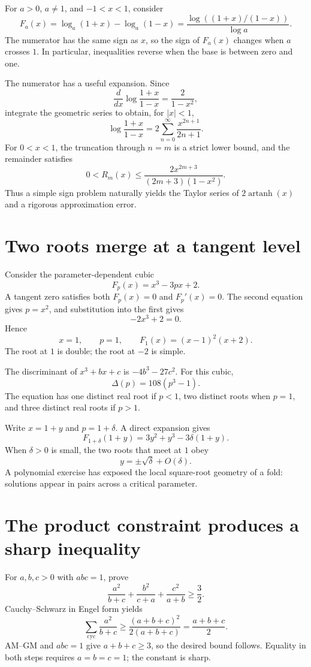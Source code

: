 For \(a>0\), \(a\ne1\), and \(-1<x<1\), consider
\[
 F_a(x)=\log_a(1+x)-\log_a(1-x)
 =\frac{\log((1+x)/(1-x))}{\log a}.
\]
The numerator has the same sign as \(x\), so the sign of \(F_a(x)\) changes when \(a\) crosses \(1\). In particular, inequalities reverse when the base is between zero and one.

The numerator has a useful expansion. Since
\[
 \frac d{dx}\log\frac{1+x}{1-x}=\frac2{1-x^2},
\]
integrate the geometric series to obtain, for \(|x|<1\),
\[
 \boxed{\log\frac{1+x}{1-x}
 =2\sum_{n=0}^{\infty}\frac{x^{2n+1}}{2n+1}.}
\]
For \(0<x<1\), the truncation through \(n=m\) is a strict lower bound, and the remainder satisfies
\[
 0<R_m(x)\le
 \frac{2x^{2m+3}}{(2m+3)(1-x^2)}.
\]
Thus a simple sign problem naturally yields the Taylor series of \(2\operatorname{artanh}(x)\) and a rigorous approximation error.

\section{Two roots merge at a tangent level}

Consider the parameter-dependent cubic
\[
 F_p(x)=x^3-3px+2.
\]
A tangent zero satisfies both \(F_p(x)=0\) and \(F_p'(x)=0\). The second equation gives \(p=x^2\), and substitution into the first gives
\[
 -2x^3+2=0.
\]
Hence
\[
 \boxed{x=1,\qquad p=1,\qquad
 F_1(x)=(x-1)^2(x+2).}
\]
The root at \(1\) is double; the root at \(-2\) is simple.

The discriminant of \(x^3+bx+c\) is \(-4b^3-27c^2\). For this cubic,
\[
 \Delta(p)=108(p^3-1).
\]
The equation has one distinct real root if \(p<1\), two distinct roots when \(p=1\), and three distinct real roots if \(p>1\).

Write \(x=1+y\) and \(p=1+\delta\). A direct expansion gives
\[
 F_{1+\delta}(1+y)
 =3y^2+y^3-3\delta(1+y).
\]
When \(\delta>0\) is small, the two roots that meet at \(1\) obey
\[
 y=\pm\sqrt\delta+O(\delta).
\]
A polynomial exercise has exposed the local square-root geometry of a fold: solutions appear in pairs across a critical parameter.

\section{The product constraint produces a sharp inequality}

For \(a,b,c>0\) with \(abc=1\), prove
\[
 \boxed{\frac{a^2}{b+c}+
        \frac{b^2}{c+a}+
        \frac{c^2}{a+b}\ge\frac32.}
\]
Cauchy--Schwarz in Engel form yields
\[
 \sum_{\mathrm{cyc}}\frac{a^2}{b+c}
 \ge\frac{(a+b+c)^2}{2(a+b+c)}
 =\frac{a+b+c}{2}.
\]
AM--GM and \(abc=1\) give \(a+b+c\ge3\), so the desired bound follows. Equality in both steps requires \(a=b=c=1\); the constant is sharp.


